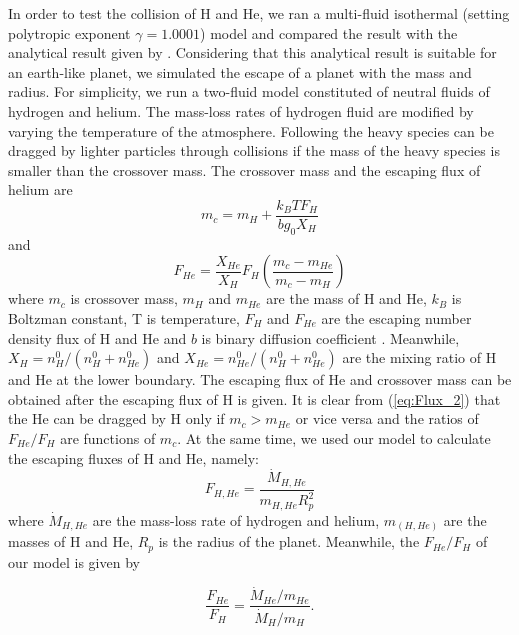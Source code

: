 \documentclass[journal, onecolumn]{aastex631}
\begin{document}
\begin{CJK*}{UTF8}{gbsn}
In order to test the collision of H and He, we ran a multi-fluid isothermal (setting polytropic exponent $\gamma = 1.0001$) model and compared the result with the analytical result given by \cite{Hunten1987}. Considering that this analytical result is suitable for an earth-like planet, we simulated the escape of a planet with the mass and radius. For simplicity, we run a two-fluid model constituted of neutral fluids of hydrogen and helium. The mass-loss rates of hydrogen fluid are modified by varying the temperature of the atmosphere. Following \cite{Hunten1987} the heavy species can be dragged by lighter particles through collisions if the mass of the heavy species is smaller than the crossover mass. The crossover mass and the escaping flux of helium are
\begin{equation}\label{eq:mc}
m_{c}=m_{H}+\frac{k_{B}TF_{H}}{bg_{0}X_{H}}
\end{equation}
and
\begin{equation}\label{eq:Flux_2}
F_{He}=\frac{X_{He}}{X_{H}}F_{H}(\frac{m_{c}-m_{He}}{m_{c}-m_{H}})
\end{equation}
where $m_{c}$ is crossover mass, $m_{H}$ and $m_{He}$ are the mass of H and He, $k_{B}$ is Boltzman constant, T is temperature, $F_{H}$ and $F_{He}$ are the escaping number density flux of H and He and $b$ is binary diffusion coefficient \citep{Mason1970}. Meanwhile,
$X_H=n^{0}_{H}/(n^{0}_{H}+n^{0}_{He})$ and $X_{He}=n^{0}_{He}/(n^{0}_{H}+n^{0}_{He})$ are the mixing ratio of H and He at the lower boundary.
The escaping flux of He and crossover mass can be obtained after the escaping flux of H is given. It is clear from (\ref{eq:Flux_2}) that the He can be dragged by H only if $m_c>m_{He}$ or vice versa and the ratios of $F_{He}/F_{H}$ are functions of $m_c $. At the same time, we used our model to calculate the escaping fluxes of H and He, namely:
\begin{equation}
F_{H,He} = \frac{\dot{M}_{H,He}}{m_{H, He}R_p^2}
\label{eq:f_H}
\end{equation}
where $\dot{M}_{H, He}$ are the mass-loss rate of hydrogen and helium, $m_{(H,He)}$ are the masses of H and He, $R_p$ is the radius of the planet. Meanwhile, the $F_{He}/F_{H}$ of our model is given by

\begin{equation}\label{eq:F0_F1}
\frac{F_{He}}{F_{H}}=\frac{\dot{M}_{He}/m_{He}}{\dot{M}_{H}/m_{H}}.
\end{equation}


\end{CJK*}
\end{document}
